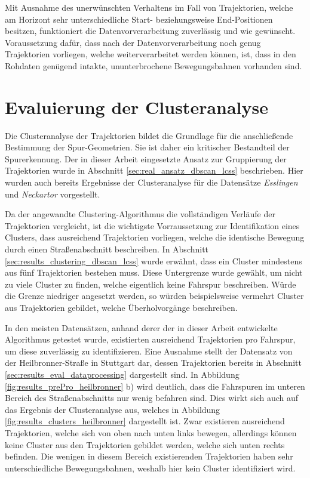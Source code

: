 Mit Ausnahme des unerwünschten Verhaltens im Fall von Trajektorien, welche am Horizont sehr unterschiedliche Start-
beziehungsweise End-Positionen besitzen, funktioniert die Datenvorverarbeitung zuverlässig und wie gewünscht.
Voraussetzung dafür, dass nach der Datenvorverarbeitung noch genug Trajektorien vorliegen, welche weiterverarbeitet werden können,
ist, dass in den Rohdaten genügend intakte, ununterbrochene Bewegungsbahnen vorhanden sind.

\section{Evaluierung der Clusteranalyse}
\label{sec:results_eval_clustering}

Die Clusteranalyse der Trajektorien bildet die Grundlage für die anschließende Bestimmung der Spur-Geometrien.
Sie ist daher ein kritischer Bestandteil der Spurerkennung. Der in dieser Arbeit eingesetzte Ansatz zur
Gruppierung der Trajektorien wurde in Abschnitt \ref{sec:real_ansatz_dbscan_lcss} beschrieben.
Hier wurden auch bereits Ergebnisse der Clusteranalyse für die Datensätze \textit{Esslingen} und
\textit{Neckartor} vorgestellt.

Da der angewandte Clustering-Algorithmus die vollständigen Verläufe der
Trajektorien vergleicht, ist die wichtigste Vorraussetzung zur Identifikation eines Clusters, dass ausreichend
Trajektorien vorliegen, welche die identische Bewegung durch einen Straßenabschnitt beschreiben.
In Abschnitt \ref{sec:results_clustering_dbscan_lcss} wurde erwähnt, dass ein Cluster mindestens aus
fünf Trajektorien bestehen muss. Diese Untergrenze wurde gewählt, um nicht zu viele Cluster zu finden, welche
eigentlich keine Fahrspur beschreiben. Würde die Grenze niedriger angesetzt werden, so würden beispielsweise
vermehrt Cluster aus Trajektorien gebildet, welche Überholvorgänge beschreiben.

In den meisten Datensätzen, anhand derer der in dieser Arbeit entwickelte Algorithmus getestet wurde,
existierten ausreichend Trajektorien pro Fahrspur, um diese zuverlässig zu identifizieren. Eine Ausnahme
stellt der Datensatz von der Heilbronner-Straße in Stuttgart dar, dessen Trajektorien bereits
in Abschnitt \ref{sec:results_eval_dataprocessing} dargestellt sind. In Abbildung \ref{fig:results_prePro_heilbronner} b)
wird deutlich, dass die Fahrspuren im unteren Bereich des Straßenabschnitts nur wenig befahren sind.
Dies wirkt sich auch auf das Ergebnis der Clusteranalyse aus, welches in Abbildung \ref{fig:results_clusters_heilbronner} dargestellt ist.
Zwar existieren ausreichend Trajektorien, welche sich von oben nach unten links bewegen, allerdings können
keine Cluster aus den Trajektorien gebildet werden, welche sich unten rechts befinden.
Die wenigen in diesem Bereich existierenden Trajektorien haben sehr unterschiedliche Bewegungsbahnen,
weshalb hier kein Cluster identifiziert wird.

